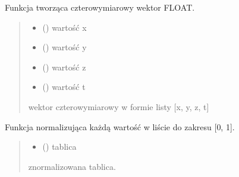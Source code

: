 \documentclass[a4paper,10pt,openany,english]{sphinxmanual}
\begin{document}
\begin{fulllineitems}
\label{\detokenize{js/js-functions:vector4f}}
\pysigstartsignatures
\pysiglinewithargsret
{}
{\sphinxparamcomma {}\sphinxparamcomma {}\sphinxparamcomma {}}
{}
\pysigstopsignatures
\sphinxAtStartPar
Funkcja tworząca czterowymiarowy wektor FLOAT.
\begin{quote}\begin{description}
\begin{itemize}
\item {} 
\sphinxAtStartPar
{} () \textendash{} wartość x

\item {} 
\sphinxAtStartPar
{} () \textendash{} wartość y

\item {} 
\sphinxAtStartPar
{} () \textendash{} wartość z

\item {} 
\sphinxAtStartPar
{} () \textendash{} wartość t

\end{itemize}

\sphinxAtStartPar
wektor czterowymiarowy w formie listy {[}x, y, z, t{]}

\end{description}\end{quote}

\end{fulllineitems}


\begin{fulllineitems}
\label{\detokenize{js/js-functions:normalize}}
\pysigstartsignatures
\pysiglinewithargsret
{}
{}
{}
\pysigstopsignatures
\sphinxAtStartPar
Funkcja normalizująca każdą wartość w liście do zakresu {[}0, 1{]}.
\begin{quote}\begin{description}
\begin{itemize}
\item {} 
\sphinxAtStartPar
{} () \textendash{} tablica

\end{itemize}

\sphinxAtStartPar
znormalizowana tablica.

\end{description}\end{quote}

\end{fulllineitems}
\end{document}
